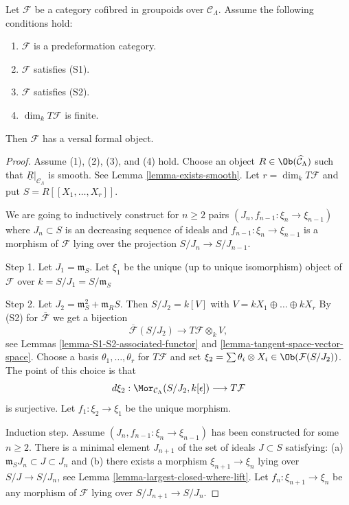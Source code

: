 \begin{lemma}
\label{lemma-versal-object-existence}
Let $\mathcal{F}$ be a category cofibred in groupoids over
$\mathcal{C}_\Lambda$. Assume the following conditions hold:
\begin{enumerate}
\item $\mathcal{F}$ is a predeformation category.
\item $\mathcal{F}$ satisfies (S1).
\item $\mathcal{F}$ satisfies (S2).
\item $\dim_k T\mathcal{F}$ is finite.
\end{enumerate}
Then $\mathcal{F}$ has a versal formal object.
\end{lemma}

\begin{proof}
Assume (1), (2), (3), and (4) hold. Choose an object
$R \in \Ob(\widehat{\mathcal{C}}_\Lambda)$
such that $\underline{R}|_{\mathcal{C}_\Lambda}$ is smooth.
See Lemma \ref{lemma-exists-smooth}.
Let $r = \dim_k T\mathcal{F}$ and put $S = R[[X_1, \ldots, X_r]]$.

\medskip\noindent
We are going to inductively construct for $n \geq 2$ pairs
$(J_n, f_{n - 1} : \xi_n \to \xi_{n - 1})$
where $J_n \subset S$ is an decreasing sequence of ideals and
$f_{n - 1} : \xi_n \to \xi_{n - 1}$ is a morphism of
$\mathcal{F}$ lying over the projection $S/J_n \to S/J_{n - 1}$.

\medskip\noindent
Step 1. Let $J_1 = \mathfrak m_S$. Let $\xi_1$ be the unique
(up to unique isomorphism) object of $\mathcal{F}$ over
$k = S/J_1 = S/\mathfrak m_S$

\medskip\noindent
Step 2. Let
$J_2 = \mathfrak m_S^2 + \mathfrak{m}_R S$. Then
$S/J_2 = k[V]$ with $V = kX_1 \oplus \ldots \oplus kX_r$
By (S2) for $\overline{\mathcal{F}}$ we get a bijection
$$
\overline{\mathcal{F}}(S/J_2)
\longrightarrow
T\mathcal{F} \otimes_k V,
$$
see
Lemmas \ref{lemma-S1-S2-associated-functor} and
\ref{lemma-tangent-space-vector-space}.
Choose a basis $\theta_1, \ldots, \theta_r$ for $T\mathcal{F}$ and set
$\xi_2 = \sum \theta_i \otimes X_i \in \Ob(\mathcal{F}(S/J_2))$.
The point of this choice is that
$$
d\xi_2 :
\Mor_{\mathcal{C}_\Lambda}(S/J_2, k[\epsilon])
\longrightarrow
T\mathcal{F}
$$
is surjective. Let $f_1 : \xi_2 \to \xi_1$ be the unique morphism.

\medskip\noindent
Induction step. Assume $(J_n, f_{n - 1} : \xi_n \to \xi_{n - 1})$ has been
constructed for some $n \geq 2$. There is a minimal element $J_{n + 1}$ of
the set of ideals $J \subset S$ satisfying:
(a) $\mathfrak m_S J_n \subset J \subset J_n$ and
(b) there exists a morphism $\xi_{n + 1} \to \xi_n$ lying over
$S/J \to S/J_n$, see
Lemma \ref{lemma-largest-closed-where-lift}.
Let $f_n : \xi_{n + 1} \to \xi_n$ be any morphism of $\mathcal{F}$
lying over $S/J_{n + 1} \to S/J_n$.


\end{proof}
